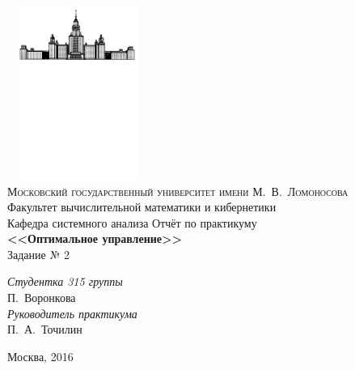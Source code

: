 \documentclass[12pt, fleqn]{article}
\begin{document}
\thispagestyle{empty}
\begin{center}
\ \vspace{-3cm}
\includegraphics[width=0.3\textwidth]{i1.pdf}\\
{\scshape Московский государственный университет имени М.~В.~Ломоносова}\\
Факультет вычислительной математики и кибернетики\\
Кафедра системного анализа
\vfill
\LARGE {Отчёт по практикуму\\
\textbf{<<Оптимальное управление>>}}\\
{Задание № 2}
\end{center}
\vspace{1cm}
\begin{flushright}
\large
\textit{Студентка 315 группы}\\
П.~Воронкова\\
\vspace{10mm}
\textit{Руководитель практикума}\\
П.~А.~Точилин
\end{flushright}
\vfill
\begin{center}
\vspace{15mm}
Москва, 2016
\end{center}
\newpage
\tableofcontents \newpage
\end{document}
